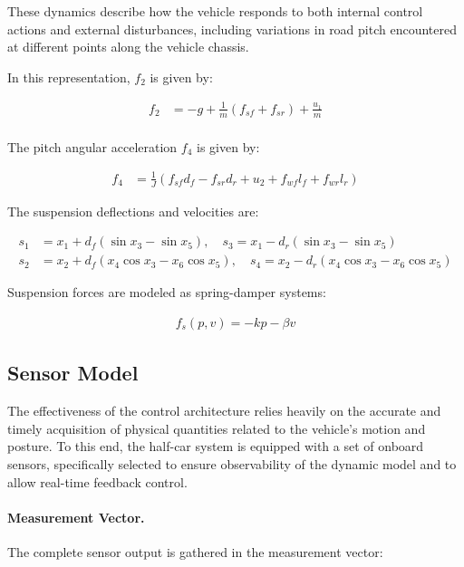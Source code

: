 \documentclass[]{report}
\begin{document}
	These dynamics describe how the vehicle responds to both internal control actions and external disturbances, including variations in road pitch encountered at different points along the vehicle chassis.
	
	In this representation, $f_2$ is given by:
	
	\begin{align}
		f_2 &= -g + \frac{1}{m}(f_{sf} + f_{sr}) + \frac{u_1}{m} \\
	\end{align}
	
	The pitch angular acceleration $f_4$ is given by:
	
	\begin{align}	
		f_4 &= \frac{1}{J}(f_{sf} d_f - f_{sr} d_r + u_2 + f_{wf} l_{f} + f_{wr} l_{r})
	\end{align}
	
	
	The suspension deflections and velocities are:
	
	\begin{align}
		s_1 &= x_1 + d_f(\sin x_3 - \sin x_5), \quad s_3 = x_1 - d_r(\sin x_3 - \sin x_5) \\
		s_2 &= x_2 + d_f(x_4 \cos x_3 - x_6 \cos x_5), \quad s_4 = x_2 - d_r(x_4 \cos x_3 - x_6 \cos x_5)
	\end{align}
	
	Suspension forces are modeled as spring-damper systems:
	
	\begin{align}
		f_s(p, v) = -k p - \beta v
	\end{align}
	
	\subsection{Sensor Model}
	
	The effectiveness of the control architecture relies heavily on the accurate and timely acquisition of physical quantities related to the vehicle's motion and posture. To this end, the half-car system is equipped with a set of onboard sensors, specifically selected to ensure observability of the dynamic model and to allow real-time feedback control.
	
	\paragraph{Measurement Vector.}
	The complete sensor output is gathered in the measurement vector:
	
\end{document}

